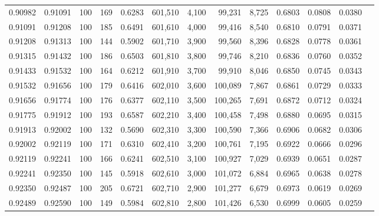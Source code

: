 \begin{tabular}{rrrrrrrrrrrrr}
0.90982 & 0.91091 &   100 & 169 &                                     0.6283 & 601,510 &   4,100 &  99,231 &   8,725 & 0.6803 & 0.0808 & 0.0380 \\
0.91091 & 0.91208 &   100 & 185 &                                     0.6491 & 601,610 &   4,000 &  99,416 &   8,540 & 0.6810 & 0.0791 & 0.0371 \\
0.91208 & 0.91313 &   100 & 144 &                                     0.5902 & 601,710 &   3,900 &  99,560 &   8,396 & 0.6828 & 0.0778 & 0.0361 \\
0.91315 & 0.91432 &   100 & 186 &                                     0.6503 & 601,810 &   3,800 &  99,746 &   8,210 & 0.6836 & 0.0760 & 0.0352 \\
0.91433 & 0.91532 &   100 & 164 &                                     0.6212 & 601,910 &   3,700 &  99,910 &   8,046 & 0.6850 & 0.0745 & 0.0343 \\
0.91532 & 0.91656 &   100 & 179 &                                     0.6416 & 602,010 &   3,600 & 100,089 &   7,867 & 0.6861 & 0.0729 & 0.0333 \\
0.91656 & 0.91774 &   100 & 176 &                                     0.6377 & 602,110 &   3,500 & 100,265 &   7,691 & 0.6872 & 0.0712 & 0.0324 \\
0.91775 & 0.91912 &   100 & 193 &                                     0.6587 & 602,210 &   3,400 & 100,458 &   7,498 & 0.6880 & 0.0695 & 0.0315 \\
0.91913 & 0.92002 &   100 & 132 &                                     0.5690 & 602,310 &   3,300 & 100,590 &   7,366 & 0.6906 & 0.0682 & 0.0306 \\
0.92002 & 0.92119 &   100 & 171 &                                     0.6310 & 602,410 &   3,200 & 100,761 &   7,195 & 0.6922 & 0.0666 & 0.0296 \\
0.92119 & 0.92241 &   100 & 166 &                                     0.6241 & 602,510 &   3,100 & 100,927 &   7,029 & 0.6939 & 0.0651 & 0.0287 \\
0.92241 & 0.92350 &   100 & 145 &                                     0.5918 & 602,610 &   3,000 & 101,072 &   6,884 & 0.6965 & 0.0638 & 0.0278 \\
0.92350 & 0.92487 &   100 & 205 &                                     0.6721 & 602,710 &   2,900 & 101,277 &   6,679 & 0.6973 & 0.0619 & 0.0269 \\
0.92489 & 0.92590 &   100 & 149 &                                     0.5984 & 602,810 &   2,800 & 101,426 &   6,530 & 0.6999 & 0.0605 & 0.0259 \\

\end{tabular}
